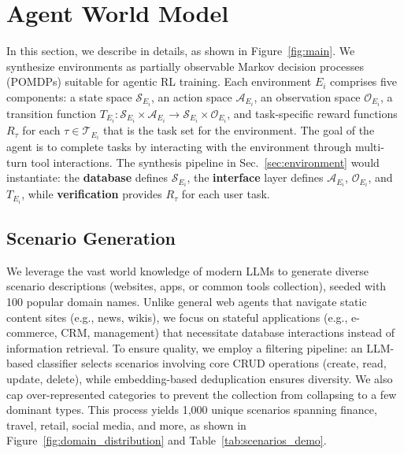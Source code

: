 \documentclass{article}
\theoremstyle{plain}
\theoremstyle{definition}
\theoremstyle{remark}
\newcommand{\synth}{\textls{\textsc{AWM}}\xspace}
\begin{document}
\section{Agent World Model}
\label{sec:method}
In this section, we describe \synth in details, as shown in Figure~\ref{fig:main}.
We synthesize environments as partially observable Markov decision processes (POMDPs) suitable for agentic RL training.
Each environment $E_i$ comprises five components: a state space $\mathcal{S}_{E_i}$, an action space $\mathcal{A}_{E_i}$, an observation space $\mathcal{O}_{E_i}$, a transition function $T_{E_i}: \mathcal{S}_{E_i} \times \mathcal{A}_{E_i} \rightarrow \mathcal{S}_{E_i} \times \mathcal{O}_{E_i}$, and task-specific reward functions $R_{\tau}$ for each $\tau \in \mathcal{T}_{E_i}$ that is the task set for the environment.
The goal of the agent is to complete tasks by interacting with the environment through multi-turn tool interactions.
The synthesis pipeline in Sec.~\ref{sec:environment} would instantiate: the \textbf{database} defines $\mathcal{S}_{E_i}$, the \textbf{interface} layer defines $\mathcal{A}_{E_i}$, $\mathcal{O}_{E_i}$, and $T_{E_i}$, while \textbf{verification} provides $R_{\tau}$ for each user task.

\subsection{Scenario Generation}
We leverage the vast world knowledge of modern LLMs to generate diverse scenario descriptions (websites, apps, or common tools collection), seeded with 100 popular domain names.
Unlike general web agents that navigate static content sites (e.g., news, wikis), we focus on stateful applications (e.g., e-commerce, CRM, management) that necessitate database interactions instead of information retrieval.
To ensure quality, we employ a filtering pipeline: an LLM-based classifier selects scenarios involving core CRUD operations (create, read, update, delete), while embedding-based deduplication ensures diversity.
We also cap over-represented categories to prevent the collection from collapsing to a few dominant types.
This process yields 1,000 unique scenarios spanning finance, travel, retail, social media, and more, as shown in Figure~\ref{fig:domain_distribution} and Table~\ref{tab:scenarios_demo}.
\end{document}
